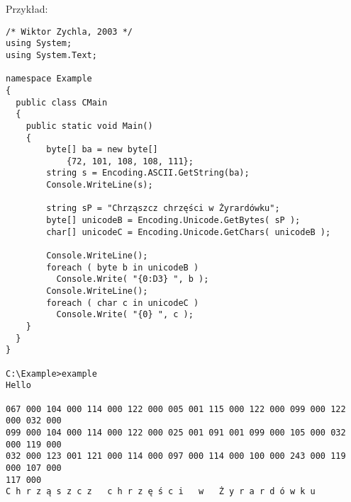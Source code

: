 Przykład:

\begin{scriptsize}
\begin{verbatim}
/* Wiktor Zychla, 2003 */
using System;
using System.Text;

namespace Example
{ 
  public class CMain
  {    
    public static void Main()
    {
        byte[] ba = new byte[]
            {72, 101, 108, 108, 111};
        string s = Encoding.ASCII.GetString(ba);
        Console.WriteLine(s);
    	
    	string sP = "Chrząszcz chrzęści w Żyrardówku";
    	byte[] unicodeB = Encoding.Unicode.GetBytes( sP );
    	char[] unicodeC = Encoding.Unicode.GetChars( unicodeB );

        Console.WriteLine();
    	foreach ( byte b in unicodeB )
    	  Console.Write( "{0:D3} ", b );
        Console.WriteLine();
    	foreach ( char c in unicodeC )
    	  Console.Write( "{0} ", c );
    }
  }
}

C:\Example>example
Hello

067 000 104 000 114 000 122 000 005 001 115 000 122 000 099 000 122 000 032 000
099 000 104 000 114 000 122 000 025 001 091 001 099 000 105 000 032 000 119 000
032 000 123 001 121 000 114 000 097 000 114 000 100 000 243 000 119 000 107 000
117 000
C h r z ą s z c z   c h r z ę ś c i   w   Ż y r a r d ó w k u
\end{verbatim}
\end{scriptsize}

